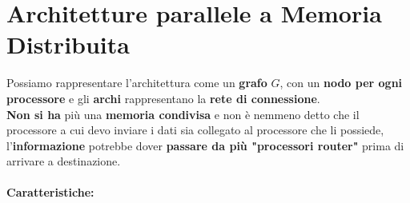 
\section{Architetture parallele a Memoria Distribuita}
Possiamo rappresentare l'architettura come un \textbf{grafo} $G$, con un \textbf{nodo per ogni processore} e gli \textbf{archi} rappresentano la \textbf{rete di connessione}. \\

\textbf{Non si ha} più una \textbf{memoria condivisa} e non è nemmeno detto che il processore a cui devo inviare i dati sia collegato al processore che li possiede, l'\textbf{informazione} potrebbe dover \textbf{passare da più "processori router"} prima di arrivare a destinazione.

\paragraph{Caratteristiche:}
